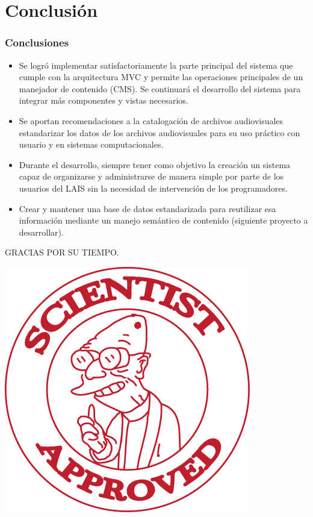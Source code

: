 \documentclass{beamer}
\begin{document}
\section{Conclusión}
\begin{frame}
	\frametitle{Conclusiones}
	\begin{itemize}
		\item Se logró implementar satisfactoriamente la parte principal del sistema que cumple con la arquitectura MVC y permite las operaciones principales de un manejador de contenido (CMS). Se continuará el desarrollo del sistema para integrar más componentes y vistas necesarios.
		\item Se aportan recomendaciones a la catalogación de archivos audiovisuales estandarizar los datos de los archivos audiovisuales para su uso práctico con usuario y en sistemas computacionales.
		\item Durante el desarrollo, siempre tener como objetivo la creación un sistema capaz de organizarse y administrarse de manera simple por parte de los usuarios del LAIS sin la necesidad de intervención de los programadores.
		\item Crear y mantener una base de datos estandarizada para reutilizar esa información mediante un manejo semántico de contenido (siguiente proyecto a desarrollar).
	\end{itemize}
\end{frame}

\begin{frame}
	\begin{center}
		GRACIAS POR SU TIEMPO.
		
		\includegraphics{scientistapprovedfutura.png}
	\end{center}
\end{frame}
\end{document}
